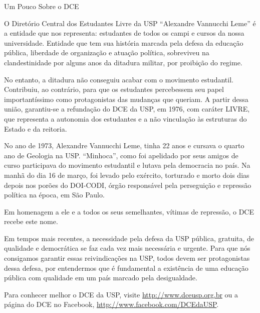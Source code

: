 \begin{secao}{Um Pouco Sobre o DCE}

O Diretório Central dos Estudantes Livre da USP ``Alexandre Vannucchi Leme'' é a
entidade que nos representa: estudantes de todos os campi e cursos da nossa universidade.
Entidade que tem sua história marcada pela defesa da educação pública, liberdade
de organização e atuação política, sobreviveu na clandestinidade por alguns anos
da ditadura militar, por proibição do regime.

No entanto, a ditadura não conseguiu acabar com o movimento estudantil. Contribuiu,
ao contrário, para que os estudantes percebessem seu papel importantíssimo como
protagonistas das mudanças que queriam. A partir dessa união, garantiu-se a
refundação do DCE da USP, em 1976, com caráter LIVRE, que representa a autonomia
dos estudantes e a não vinculação às estruturas do Estado e da reitoria.

No ano de 1973, Alexandre Vannucchi Leme, tinha 22 anos e cursava o quarto ano
de Geologia na USP. ``Minhoca'', como foi apelidado por seus amigos de curso participava
do movimento estudantil e lutava pela democracia no país. Na manhã do dia 16 de março,
foi levado pelo exército, torturado e morto dois dias depois nos porões do DOI-CODI,
órgão responsável pela perseguição e repressão política na época, em São Paulo.

Em homenagem a ele e a todos os seus semelhantes, vítimas de repressão, o DCE recebe este nome.

Em tempos mais recentes, a necessidade pela defesa da USP pública, gratuita, de qualidade
e democrática se faz cada vez mais necessária e urgente. Para que nós consigamos
garantir essas reivindicações na USP, todos devem ser protagonistas dessa defesa,
por entendermos que é fundamental a existência de uma educação pública com qualidade
em um país marcado pela desigualdade.

Para conhecer melhor o DCE da USP, visite \url{http://www.dceusp.org.br} ou a página do DCE no Facebook,
\url{http://www.facebook.com/DCEdaUSP}.

\end{secao}
